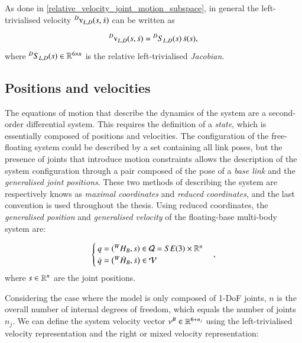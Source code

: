 As done in \ref{relative_velocity_joint_motion_subspace}, in general the left-trivialised velocity ${}^{D}{\text{v}}_{L,D}(s, \dot{s})$ can be written as

\begin{equation}\label{relative_left_trivialised_velocity_jacobian}
    {}^{D}{\text{v}}_{L,D}(s, \dot{s}) = {}^{D}{S}_{L,D}(s)\,\dot{s}(s),
\end{equation}
where ${}^{D}{S}_{L,D}(s) \in \mathbb{R}^{6\times n}$ is the relative left-trivialised \textit{Jacobian}.


\subsection{Positions and velocities}\label{ssec_multibody_lagrangian}
The equations of motion that describe the dynamics of the system are a second-order differential system. This requires the definition of a \textit{state}, which is essentially composed of positions and velocities. 
The configuration of the free-floating system could be described by a set containing all link poses, but the presence of joints that introduce motion constraints allows the description of the system configuration through a pair composed of the pose of a \textit{base link} and the \textit{generalised joint positions}. These two methods of describing the system are respectively knows as \textit{maximal coordinates} and \textit{reduced coordinates}, and the last convention is used throughout the thesis.
Using reduced coordinates, the \textit{generalised position} and \textit{generalised velocity} of the floating-base multi-body system are:

\begin{equation}\label{state_reduced_coordinates}
    \begin{cases}
        q = ({}^{W}{H}_{B}, s) \in \mathcal{Q} = SE(3) \times \mathbb{R}^n\\
        \dot{q} = \big( {}^{W}{\dot{H}}_{B}, \dot{s} \big) \in \mathcal{V}
    \end{cases},
\end{equation}
where $s \in \mathbb{R}^{n}$ are the joint positions.

Considering the case where the model is only composed of 1-DoF joints, $n$ is the overall number of internal degrees of freedom, which equals the number of joints $n_j$. We can define the system velocity vector $\nu^B \in \mathbb{R}^{6+n_j}$ using the left-trivialised velocity representation and the right or mixed velocity representation:

